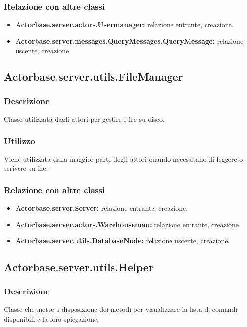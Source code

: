 \documentclass[a4paper]{article}
\begin{document}
			\subsubsection{Relazione con altre classi}
			\begin{itemize}
				\item \textbf{Actorbase.server.actors.Usermanager:} relazione entrante, creazione.
				\item \textbf{Actorbase.server.messages.QueryMessages.QueryMessage:} relazione uscente, creazione. 
			\end{itemize}
		
		\subsection{Actorbase.server.utils.FileManager}
			\subsubsection{Descrizione}
				Classe utilizzata dagli attori per gestire i file su disco.
				
			\subsubsection{Utilizzo}
				Viene utilizzata dalla maggior parte degli attori quando necessitano di leggere o scrivere su file.
				
			\subsubsection{Relazione con altre classi}
				\begin{itemize}
					\item \textbf{Actorbase.server.Server:} relazione entrante, creazione.
					\item \textbf{Actorbase.server.actors.Warehouseman:} relazione entrante, creazione.
					\item \textbf{Actorbase.server.utils.DatabaseNode:} relazione uscente, creazione. 
				\end{itemize}
				
		\subsection{Actorbase.server.utils.Helper}
			\subsubsection{Descrizione}
				Classe che mette a disposizione dei metodi per visualizzare la lista di comandi disponibili e la loro spiegazione.
				
\end{document}
